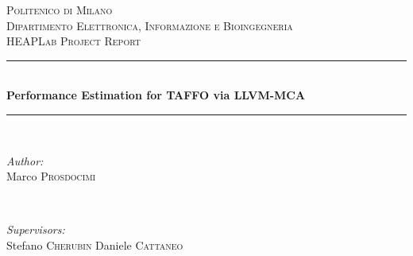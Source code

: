 \begin{titlepage}

\newcommand{\HRule}{\rule{\linewidth}{0.5mm}} %

\center %
 

\textsc{\LARGE Politenico di Milano}\\[1.5cm] %
\textsc{\Large Dipartimento Elettronica, Informazione e Bioingegneria}\\[0.5cm] %
\textsc{\large HEAPLab Project Report}\\[0.5cm] %


\HRule \\[0.4cm]
{ \huge \bfseries Performance Estimation for TAFFO via LLVM-MCA}\\[0.4cm] %
\HRule \\[1.5cm]
 

\begin{minipage}{0.4\textwidth}
\begin{flushleft} \large
\emph{Author:}\\
Marco \textsc{Prosdocimi} %
\end{flushleft}
\end{minipage}
~
\begin{minipage}{0.4\textwidth}
\begin{flushright} \large
\emph{Supervisors:} \\
Stefano \textsc{Cherubin} %
Daniele \textsc{Cattaneo} %
\end{flushright}
\end{minipage}\\[2cm]


\end{titlepage}

